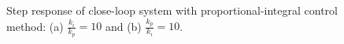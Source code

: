 \begin{figure}
	\centering
	\hfill
	\caption{Step response of close-loop system with proportional-integral control method: (a) $\frac{k_i}{k_p}=10$ and (b) $\frac{k_p}{k_i}=10$.}
	\label{fig:q5_step_T_PI}
\end{figure}

